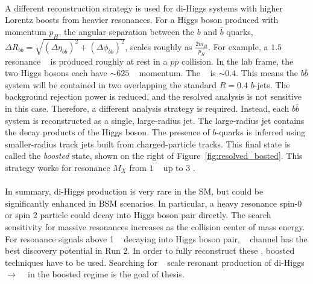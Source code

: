 \paragraph{}
A different reconstruction strategy is used for di-Higgs systems with higher Lorentz boosts from heavier resonances.
For a Higgs boson produced with momentum $p_{H}$, the angular separation between the $b$ and $\bar{b}$ quarks, $\Delta R_{bb} = \sqrt{(\Delta\eta_{bb})^{2} + (\Delta\phi_{bb})^{2}}$, scales roughly as $\frac{2m_H}{p_{H}}$.
For example, a $1.5$ \TeV~ resonance \Grav~ is produced roughly at rest in a $pp$ collision. 
In the lab frame, the two Higgs bosons each have $\sim 625$ \GeV~ momentum. 
The \drbb~ is $\sim 0.4$.
This means the $b\bar{b}$ system will be contained in two overlapping the standard $R=0.4$ $b$-jets.
The background rejection power is reduced, and the resolved analysis is not sensitive in this case.
Therefore, a different analysis strategy is required.
Instead, each $b\bar{b}$ system is reconstructed as a single, large-radius jet.
The large-radius jet contains the decay products of the Higgs boson.
The presence of $b$-quarks is inferred using smaller-radius track jets built from charged-particle tracks.
This final state is called the \textit{boosted} state, shown on the right of Figure~\ref{fig:resolved_bosted}.
This strategy works for resonance $M_X$ from $1$ \GeV~ up to $3$ \TeV.

\paragraph{}
In summary, di-Higgs production is very rare in the SM, but could be significantly enhanced in BSM scenarios. 
In particular, a heavy resonance spin-0 or spin 2 particle could decay into Higgs boson pair directly. 
The search sensitivity for massive resonances increases as the collision center of mass energy. 
For resonance signals above 1 \TeV~ decaying into Higgs boson pair, \bbbb~ channel has the best discovery potential in Run 2. 
In order to fully reconstruct these \Xtohhb, boosted techniques have to be used. 
Searching for \TeV~ scale resonant production of di-Higgs $\to$ \bbbb~ in the boosted regime is the goal of thesis.


